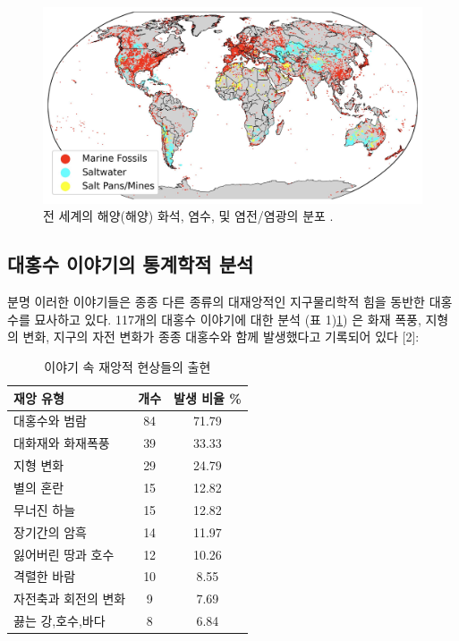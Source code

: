\documentclass[10pt,twocolumn,letterpaper]{article}
\begin{document}
\begin{figure}[b]
\begin{center}
\includegraphics[width=1\textwidth]{marine.jpg}
\end{center}
   \caption{전 세계의 해양(해양) 화석, 염수, 및 염전/염광의 분포 \cite{15,16,86,87}.}
   \label{fig:2}
\end{figure}

\subsection{대홍수 이야기의 통계학적 분석}

분명  이러한 이야기들은 종종 다른 종류의 대재앙적인 지구물리학적 힘을 동반한 대홍수를 묘사하고 있다. 117개의 대홍수 이야기에 대한 분석 (표 1)\ref{tab: 1}) 은 화재 폭풍, 지형의 변화, 지구의 자전 변화가 종종 대홍수와 함께 발생했다고 기록되어 있다 [2]\cite{14}:

\begin{table}[ht]
\begin{center}
\renewcommand{\arraystretch}{1.2}  
\begin{tabular}{|l|c|c|}
\hline
\textbf{재앙 유형} & \textbf{개수} & \textbf{발생 비율 \%} \\
\hline\hline
대홍수와 범람                   & 84 & 71.79 \\
대화재와 화재폭풍         & 39 & 33.33 \\
지형 변화               & 29 & 24.79 \\
별의 혼란               & 15 & 12.82 \\
무너진 하늘               & 15 & 12.82 \\
장기간의 암흑               & 14 & 11.97 \\
잃어버린 땅과 호수      & 12 & 10.26 \\
격렬한 바람           & 10 & 8.55  \\
자전축과 회전의 변화            & 9 & 7.69  \\
끓는 강,호수,바다       & 8 & 6.84 \\
\hline
\end{tabular}
\end{center}
\caption{이야기 속 재앙적 현상들의 출현 }
\label{tab: 1}
\end{table}
\end{document}
